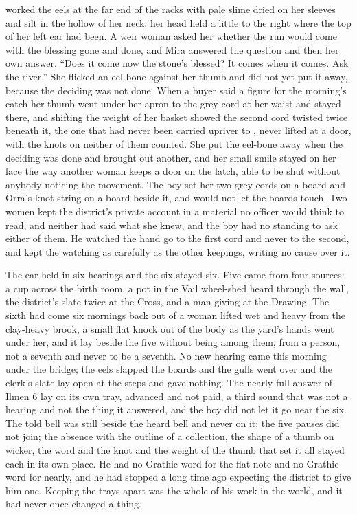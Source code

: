  worked the eels at the far end of the racks with pale slime dried on her sleeves and silt in the hollow of her neck, her head held a little to the right where the top of her left ear had been. A weir woman asked her whether the run would come with the blessing gone and done, and Mira answered the question and then her own answer. “Does it come now the stone's blessed? It comes when it comes. Ask the river.” She flicked an eel-bone against her thumb and did not yet put it away, because the deciding was not done. When a buyer said a figure for the morning's catch her thumb went under her apron to the grey cord at her waist and stayed there, and shifting the weight of her basket showed the second cord twisted twice beneath it, the one that had never been carried upriver to , never lifted at a door, with the knots on neither of them counted. She put the eel-bone away when the deciding was done and brought out another, and her small smile stayed on her face the way another woman keeps a door on the latch, able to be shut without anybody noticing the movement. The boy set her two grey cords on a board and Orra's knot-string on a board beside it, and would not let the boards touch. Two women kept the district's private account in a material no officer would think to read, and neither had said what she knew, and the boy had no standing to ask either of them. He watched the hand go to the first cord and never to the second, and kept the watching as carefully as the other keepings, writing no cause over it.

\scenebreak

The ear held  in six hearings and the six stayed six. Five came from four sources: a cup across the birth room, a pot in the Vail wheel-shed heard through the wall, the district's slate twice at the Cross, and a man giving at the Drawing. The sixth had come six mornings back out of a woman lifted wet and heavy from the clay-heavy brook, a small flat knock out of the body as the yard's hands went under her, and it lay beside the five without being among them, from a person, not a seventh and never to be a seventh. No new hearing came this morning under the bridge; the eels slapped the boards and the gulls went over and the clerk's slate lay open at the steps and gave nothing. The nearly full answer of Ilmen 6 lay on its own tray, advanced and not paid, a third sound that was not a hearing and not the thing it answered, and the boy did not let it go near the six. The told bell was still beside the heard bell and never on it; the five pauses did not join; the absence with the outline of a collection, the shape of a thumb on wicker, the word and the knot and the weight of the thumb that set it all stayed each in its own place. He had no Grathic word for the flat note and no Grathic word for nearly, and he had stopped a long time ago expecting the district to give him one. Keeping the trays apart was the whole of his work in the world, and it had never once changed a thing.

